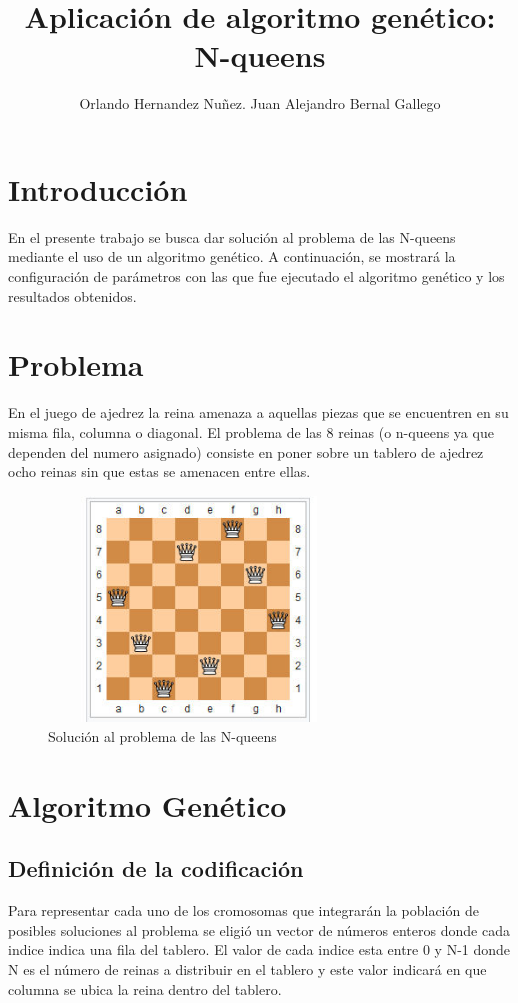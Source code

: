 \documentclass[11pt]{article}
\begin{document}
\title{Aplicaci\'on de algoritmo gen\'etico: N-queens }
\author{Orlando Hernandez Nu\~nez. Juan Alejandro Bernal Gallego}
\maketitle

\section{Introducci\'on}
En el presente trabajo se busca dar soluci\'on al problema de las N-queens mediante el uso de un algoritmo gen\'etico. A continuaci\'on, se mostrar\'a la configuraci\'on de par\'ametros con las que fue ejecutado el algoritmo gen\'etico y los resultados obtenidos.

\section{Problema}
En el juego de ajedrez la reina amenaza a aquellas piezas que se encuentren en su misma fila, columna o diagonal. El problema de las 8 reinas (o n-queens ya que dependen del numero asignado) consiste en poner sobre un tablero de ajedrez ocho reinas sin que estas se amenacen entre ellas.
\begin{figure}[h]
\includegraphics[width=8cm, height=6cm]{nqueens}
\centering
\caption{Soluci\'on al problema de las N-queens}
\end{figure}
\section{Algoritmo Gen\'etico}
\subsection{Definici\'on de la codificaci\'on}
Para representar cada uno de los cromosomas que integrar\'an la poblaci\'on de posibles soluciones 
al problema se eligi\'o un vector de n\'umeros enteros donde cada indice indica una fila del tablero. 
El valor de cada indice esta entre 0 y N-1 donde N es el n\'umero de reinas a distribuir en el tablero
y este valor indicar\'a en que columna se ubica la reina dentro del tablero.
\end{document}
